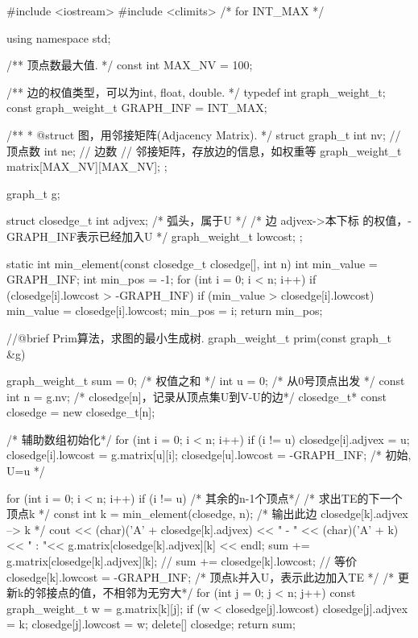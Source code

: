 \begin{Codex}[label=am_graph_prim1.cpp]
    #include <iostream>
    #include <climits>  /* for INT_MAX */

    using namespace std;

    /** 顶点数最大值. */
    const int MAX_NV = 100;

    /** 边的权值类型，可以为int, float, double. */
    typedef int graph_weight_t;
    const graph_weight_t GRAPH_INF = INT_MAX;

    /**
     * @struct 图，用邻接矩阵(Adjacency Matrix).
     */
    struct graph_t {
        int nv; // 顶点数
        int ne; // 边数
        // 邻接矩阵，存放边的信息，如权重等
        graph_weight_t matrix[MAX_NV][MAX_NV];
    };

    graph_t g;

    struct closedge_t {
        int adjvex; /* 弧头，属于U */
        /* 边 adjvex->本下标 的权值，-GRAPH_INF表示已经加入U */
        graph_weight_t lowcost;
    };

    static int min_element(const closedge_t closedge[], int n) {
        int min_value = GRAPH_INF;
        int min_pos = -1;
        for (int i = 0; i < n; i++)
            if (closedge[i].lowcost > -GRAPH_INF) {
                if (min_value > closedge[i].lowcost) {
                    min_value = closedge[i].lowcost;
                    min_pos = i;
                }
            }
        return min_pos;
    }

    //@brief Prim算法，求图的最小生成树.
    graph_weight_t prim(const graph_t &g) {
        graph_weight_t sum = 0; /* 权值之和 */
        int u = 0; /* 从0号顶点出发 */
        const int n = g.nv;
        /* closedge[n]，记录从顶点集U到V-U的边*/
        closedge_t* const closedge = new closedge_t[n];

        /* 辅助数组初始化*/
        for (int i = 0; i < n; i++) if (i != u) {
            closedge[i].adjvex = u;
            closedge[i].lowcost = g.matrix[u][i];
        }
        closedge[u].lowcost = -GRAPH_INF; /* 初始, U={u} */

        for (int i = 0; i < n; i++) if (i != u) { /* 其余的n-1个顶点*/
            /* 求出TE的下一个顶点k */
            const int k = min_element(closedge, n);
            /* 输出此边 closedge[k].adjvex --> k */
            cout << (char)('A' + closedge[k].adjvex) << " - " << (char)('A' + k)
                    << " : "<< g.matrix[closedge[k].adjvex][k] << endl;
            sum += g.matrix[closedge[k].adjvex][k];
            // sum += closedge[k].lowcost;  // 等价
            closedge[k].lowcost = -GRAPH_INF;  /* 顶点k并入U，表示此边加入TE */
            /* 更新k的邻接点的值，不相邻为无穷大*/
            for (int j = 0; j < n; j++) {
                const graph_weight_t w = g.matrix[k][j];
                if (w < closedge[j].lowcost) {
                    closedge[j].adjvex = k;
                    closedge[j].lowcost = w;
                }
            }
        }
        delete[] closedge;
        return sum;
    }


\end{Codex}
